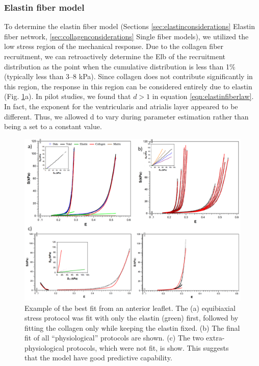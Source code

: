 \subsubsection{Elastin fiber model} \label{c2:sec:elastinfibermodel}

    To determine the elastin fiber model (Sections \ref{sec:elastinconsiderations} Elastin fiber network, \ref{sec:collagenconsiderations} Single fiber models), we utilized the low stress region of the mechanical response. Due to the collagen fiber recruitment, we can retroactively determine the Elb of the recruitment distribution as the point when the cumulative distribution is less than 1\% (typically less than 3–8 kPa). Since collagen does not contribute significantly in this region, the response in this region can be considered entirely due to elastin (Fig. \ref{c2:fig:4}a). In pilot studies, we found that $d>1$ in equation \ref{eqn:elastinfiberlaw}. In fact, the exponent for the ventricularis and atrialis layer appeared to be different. Thus, we allowed d to vary during parameter estimation rather than being a set to a constant value.


\begin{figure}
\centering
\includegraphics[width=\textwidth]{Images/chapter2/figure4.pdf}
\caption{Example of the best fit from an anterior leaflet. The (a) equibiaxial stress protocol was fit with only the elastin (green) first, followed by fitting the collagen only while keeping the elastin fixed. (b) The final fit of all “physiological” protocols are shown. (c) The two extra-physiological protocols, which were not fit, is show. This suggests that the model have good predictive capability.}
\label{c2:fig:4}
\end{figure}




